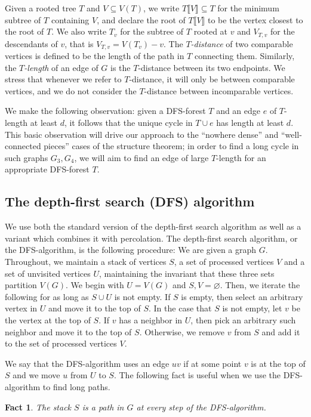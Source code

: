\documentclass[10pt]{article}
\newtheorem{fact}[theorem]{Fact}
\theoremstyle{definition}
\begin{document}
    
    Given a rooted tree $T$ and $V\subseteq V(T)$, we write $T\llbracket V\rrbracket\subseteq T$ for the minimum subtree of $T$ containing $V$, and declare the root of $T\llbracket V\rrbracket$ to be the vertex closest to the root of $T$. We also write $T_v$ for the subtree of $T$ rooted at $v$ and $V_{T,v}$ for the descendants of $v$, that is $V_{T,v}=V(T_v)-v$. The \textit{$T$-distance} of two comparable vertices is defined to be the length of the path in $T$ connecting them. Similarly, the \textit{$T$-length} of an edge of $G$ is the $T$-distance between its two endpoints. We stress that whenever we refer to $T$-distance, it will only be between comparable vertices, and we do not consider the $T$-distance between incomparable vertices.


   We make the following observation: given a DFS-forest $T$ and an edge $e$ of $T$-length at least $d$, it follows that the unique cycle in $T\cup e$ has length at least $d$. This basic observation will drive our approach to the ``nowhere dense'' and ``well-connected pieces'' cases of the structure theorem; in order to find a long cycle in such graphs $G_3, G_4$, we will aim to find an edge of large $T$-length for an appropriate DFS-forest $T$.
\subsection{The depth-first search (DFS) algorithm}

    We use both the standard version of the depth-first search algorithm as well as a variant which combines it with percolation. The depth-first search algorithm, or the DFS-algorithm, is the following procedure: We are given a graph $G$. Throughout, we maintain a stack of vertices $S$, a set of processed vertices $V$ and a set of unvisited vertices $U$, maintaining the invariant that these three sets partition $V(G)$. We begin with $U=V(G)$ and $S,V=\varnothing$. Then, we iterate the following for as long as $S\cup U$ is not empty. If $S$ is empty, then select an arbitrary vertex in $U$ and move it to the top of $S$. In the case that $S$ is not empty, let $v$ be the vertex at the top of $S$. If $v$ has a neighbor in $U$, then pick an arbitrary such neighbor and move it to the top of $S$. Otherwise, we remove $v$ from $S$ and add it to the set of processed vertices $V$.

    We say that the DFS-algorithm uses an edge $uv$ if at some point $v$ is at the top of $S$ and we move $u$ from $U$ to $S$. The following fact is useful when we use the DFS-algorithm to find long paths.
    \begin{fact}\label{fact: DFS-path}
        The stack $S$ is a path in $G$ at every step of the DFS-algorithm.
    \end{fact}
    
\end{document}
